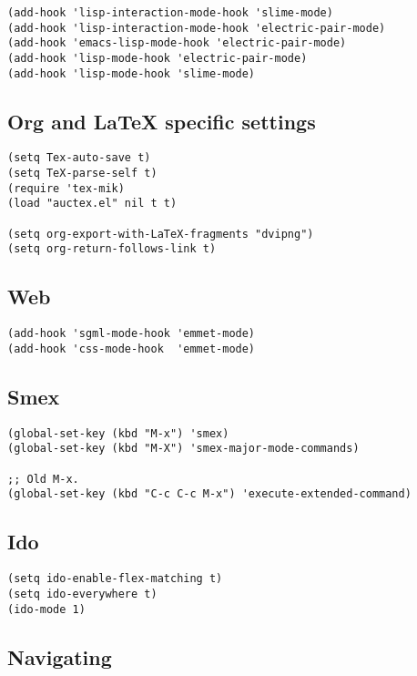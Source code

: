 \documentclass[11pt]{article}
\begin{document}
\begin{verbatim}
(add-hook 'lisp-interaction-mode-hook 'slime-mode)
(add-hook 'lisp-interaction-mode-hook 'electric-pair-mode)
(add-hook 'emacs-lisp-mode-hook 'electric-pair-mode)
(add-hook 'lisp-mode-hook 'electric-pair-mode)
(add-hook 'lisp-mode-hook 'slime-mode)
\end{verbatim}


\subsection{Org and \LaTeX{} specific settings}
\label{sec-1-3}

\begin{verbatim}
(setq Tex-auto-save t)
(setq TeX-parse-self t)
(require 'tex-mik) 
(load "auctex.el" nil t t)

(setq org-export-with-LaTeX-fragments "dvipng")
(setq org-return-follows-link t)
\end{verbatim}


\subsection{Web}
\label{sec-1-4}

\begin{verbatim}
(add-hook 'sgml-mode-hook 'emmet-mode)
(add-hook 'css-mode-hook  'emmet-mode)
\end{verbatim}


\subsection{Smex}
\label{sec-1-5}

\begin{verbatim}
(global-set-key (kbd "M-x") 'smex)
(global-set-key (kbd "M-X") 'smex-major-mode-commands)

;; Old M-x.
(global-set-key (kbd "C-c C-c M-x") 'execute-extended-command)
\end{verbatim}


\subsection{Ido}
\label{sec-1-6}

\begin{verbatim}
(setq ido-enable-flex-matching t)
(setq ido-everywhere t)
(ido-mode 1)
\end{verbatim}


\subsection{Navigating}
\label{sec-1-7}
\end{document}
